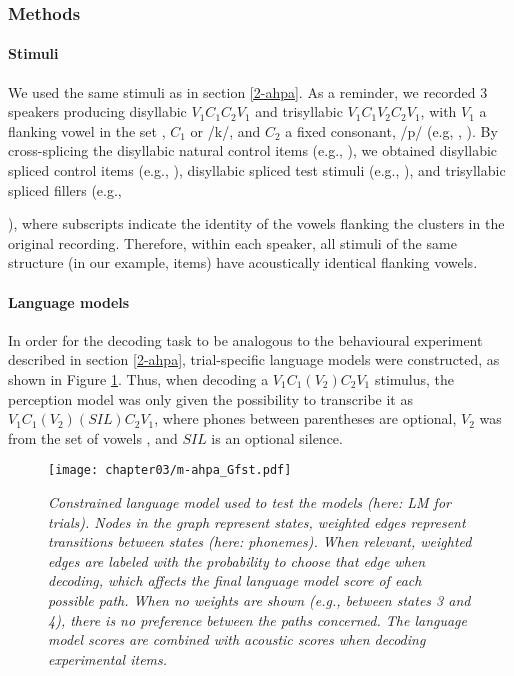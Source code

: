\subsubsection{Methods}
\paragraph{Stimuli}
We used the same stimuli as in section \ref{2-ahpa}. As a reminder, we recorded 3 speakers producing disyllabic $V_{1}C_{1}C_{2}V_{1}$ and trisyllabic $V_{1}C_{1}V_{2}C_{2}V_{1}$, with $V_{1}$ a flanking vowel in the set , $C_{1}$  or /k/, and $C_{2}$ a fixed consonant, /p/ (e.g, , ). By cross-splicing the disyllabic natural control items (e.g., ), we obtained disyllabic spliced control items (e.g., \texorpdfstring{}{}), disyllabic spliced test stimuli (e.g., \texorpdfstring{}{}), and trisyllabic spliced fillers (e.g., {), where subscripts indicate the identity of the vowels flanking the clusters in the original recording. Therefore, within each speaker, all stimuli of the same structure (in our example,  items) have acoustically identical flanking vowels.
  
\paragraph{Language models}
In order for the decoding task to be analogous to the behavioural experiment described in section \ref{2-ahpa}, trial-specific language models were constructed, as shown in Figure \ref{fig:m-ahpa_G}. Thus, when decoding a $V_{1}C_{1}(V_{2})C_{2}V_{1}$ stimulus, the perception model was only given the possibility to transcribe it as $V_{1}C_{1}(V_{2})(SIL)C_{2}V_{1}$, where phones between parentheses are optional, $V_{2}$ was from the set of vowels , and $SIL$ is an optional silence. 

\begin{figure}[htb]
    \centering
    \texttt{[image: chapter03/m-ahpa\_Gfst.pdf]}
    \caption{\textit{Constrained language model used to test the models (here: LM for  trials). Nodes in the graph represent states, weighted edges represent transitions between states (here: phonemes). When relevant, weighted edges are labeled with the probability to choose that edge when decoding, which affects the final language model score of each possible path. When no weights are shown (e.g., between states 3 and 4), there is no preference between the paths concerned. The language model scores are combined with acoustic scores when decoding experimental items.}}
    \label{fig:m-ahpa_G}
\end{figure}

}
